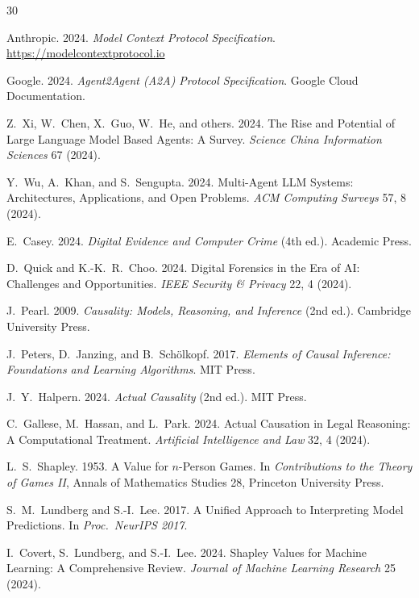 \documentclass[sigconf,nonacm]{acmart}
\begin{document}
\sloppy

\begin{thebibliography}{30}

Anthropic. 2024. \textit{Model Context Protocol Specification}.
\url{https://modelcontextprotocol.io}

Google. 2024. \textit{Agent2Agent (A2A) Protocol Specification}.
Google Cloud Documentation.

Z.~Xi, W.~Chen, X.~Guo, W.~He, and others. 2024. The Rise and
Potential of Large Language Model Based Agents: A Survey.
\textit{Science China Information Sciences} 67 (2024).

Y.~Wu, A.~Khan, and S.~Sengupta. 2024. Multi-Agent LLM Systems:
Architectures, Applications, and Open Problems.
\textit{ACM Computing Surveys} 57, 8 (2024).

E.~Casey. 2024. \textit{Digital Evidence and Computer Crime}
(4th ed.). Academic Press.

D.~Quick and K.-K.~R.~Choo. 2024. Digital Forensics in the
Era of AI: Challenges and Opportunities.
\textit{IEEE Security \& Privacy} 22, 4 (2024).

J.~Pearl. 2009. \textit{Causality: Models, Reasoning, and Inference}
(2nd ed.). Cambridge University Press.

J.~Peters, D.~Janzing, and B.~Sch\"olkopf. 2017. \textit{Elements
of Causal Inference: Foundations and Learning Algorithms}. MIT Press.

J.~Y.~Halpern. 2024. \textit{Actual Causality} (2nd ed.). MIT Press.

C.~Gallese, M.~Hassan, and L.~Park. 2024. Actual Causation in
Legal Reasoning: A Computational Treatment.
\textit{Artificial Intelligence and Law} 32, 4 (2024).

L.~S.~Shapley. 1953. A Value for $n$-Person Games. In
\textit{Contributions to the Theory of Games II}, Annals of
Mathematics Studies 28, Princeton University Press.

S.~M.~Lundberg and S.-I.~Lee. 2017. A Unified Approach to
Interpreting Model Predictions. In \textit{Proc.\ NeurIPS 2017}.

I.~Covert, S.~Lundberg, and S.-I.~Lee. 2024. Shapley Values
for Machine Learning: A Comprehensive Review.
\textit{Journal of Machine Learning Research} 25 (2024).


\end{thebibliography}
\end{document}
